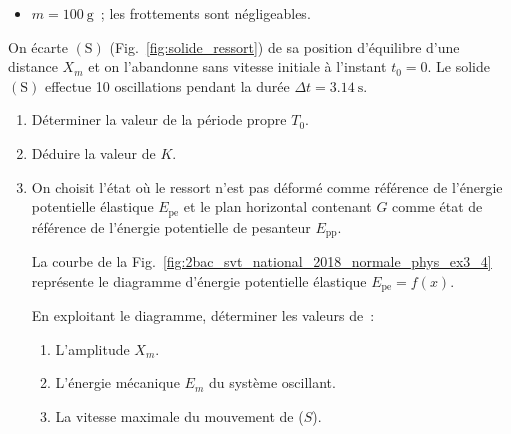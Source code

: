 \begin{donnees}
    \begin{itemize}
        \item $m=\qty{100}{\gram}$~; les frottements sont négligeables.
    \end{itemize}
\end{donnees}

On écarte $\mathrm{(S)}$ (Fig.~\ref{fig:solide_ressort}) de sa position
d'équilibre d'une distance $X_{m}$ et on l'abandonne sans vitesse initiale à
l'instant $t_{0}=0$. Le solide $\mathrm{(S)}$ effectue 10 oscillations pendant
la durée ${\Delta t=\qty{3,14}{\second}}$.

\begin{minipage}[t][][t]{0.65\linewidth}
    \begin{enumerate}
        \item Déterminer la valeur de la période propre $T_{0}$.
        \item Déduire la valeur de $K$.
        \item On choisit l'état où le ressort n'est pas déformé comme référence
              de l'énergie potentielle élastique $E_{\mathrm{pe}}$ et le plan
              horizontal contenant $G$ comme état de référence de l'énergie
              potentielle de pesanteur $E_{\mathrm{pp}}$.

              La courbe de la
              Fig.~\ref{fig:2bac_svt_national_2018_normale_phys_ex3_4} représente le
              diagramme d'énergie potentielle élastique $E_{\mathrm{pe}}=f(x)$.
              
              En exploitant le diagramme, déterminer les valeurs de~:
              \begin{enumerate}
                  \item L'amplitude $X_{m}$.
                  \item L'énergie mécanique $E_{m}$ du système oscillant.
                  \item La vitesse maximale du mouvement de ($S$).
              \end{enumerate}
    \end{enumerate}
\end{minipage}
\hfill

